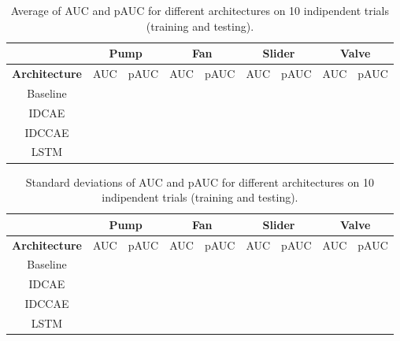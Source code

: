 \begin{table}[ht]
\centering
\begin{tabular}{|c|c|c|c|c|c|c|c|c|} 
\cline{2-9}
\multicolumn{1}{c|}{} & \multicolumn{2}{c|}{\textbf{Pump}} & \multicolumn{2}{c|}{\textbf{Fan}} & \multicolumn{2}{c|}{\textbf{Slider}} & \multicolumn{2}{c|}{\textbf{Valve}} \\ 
\hline
\textbf{Architecture} & AUC & pAUC & AUC & pAUC & AUC & pAUC & AUC & pAUC \\ 
\hline
Baseline &  &  &  &  &  &  &  &  \\ 
\hline
IDCAE &  &  &  &  &  &  &  &  \\ 
\hline
IDCCAE &  &  &  &  &  &  &  &  \\ 
\hline
LSTM &  &  &  &  &  &  &  &  \\
\hline
\end{tabular}
\caption{Average of AUC and pAUC for different architectures on 10 indipendent trials (training and testing).}
\label{datasets-average-results}
\end{table}
\begin{table}[ht]
\centering
\begin{tabular}{|c|c|c|c|c|c|c|c|c|} 
\cline{2-9}
\multicolumn{1}{c|}{} & \multicolumn{2}{c|}{\textbf{Pump}} & \multicolumn{2}{c|}{\textbf{Fan}} & \multicolumn{2}{c|}{\textbf{Slider}} & \multicolumn{2}{c|}{\textbf{Valve}} \\ 
\hline
\textbf{Architecture} & AUC & pAUC & AUC & pAUC & AUC & pAUC & AUC & pAUC \\ 
\hline
Baseline &  &  &  &  &  &  &  &  \\ 
\hline
IDCAE &  &  &  &  &  &  &  &  \\ 
\hline
IDCCAE &  &  &  &  &  &  &  &  \\ 
\hline
LSTM &  &  &  &  &  &  &  &  \\
\hline
\end{tabular}
\caption{Standard deviations of AUC and pAUC for different architectures on 10 indipendent trials (training and testing).}
\label{datasets-std-dev-results}
\end{table}

